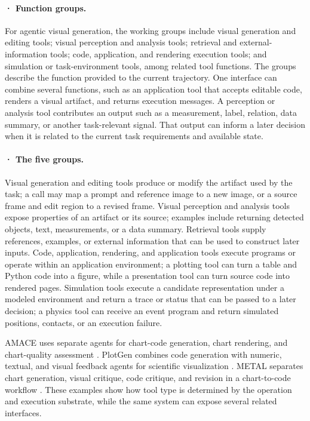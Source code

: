 \paragraph{· Function groups.} For agentic visual generation, the working groups include visual generation and editing tools; visual perception and analysis tools; retrieval and external-information tools; code, application, and rendering execution tools; and simulation or task-environment tools, among related tool functions. The groups describe the function provided to the current trajectory. One interface can combine several functions, such as an application tool that accepts editable code, renders a visual artifact, and returns execution messages. A perception or analysis tool contributes an output such as a measurement, label, relation, data summary, or another task-relevant signal. That output can inform a later decision when it is related to the current task requirements and available state.

\paragraph{· The five groups.} Visual generation and editing tools produce or modify the artifact used by the task; a call may map a prompt and reference image to a new image, or a source frame and edit region to a revised frame. Visual perception and analysis tools expose properties of an artifact or its source; examples include returning detected objects, text, measurements, or a data summary. Retrieval tools supply references, examples, or external information that can be used to construct later inputs. Code, application, rendering, and application tools execute programs or operate within an application environment; a plotting tool can turn a table and Python code into a figure, while a presentation tool can turn source code into rendered pages. Simulation tools execute a candidate representation under a modeled environment and return a trace or status that can be passed to a later decision; a physics tool can receive an event program and return simulated positions, contacts, or an execution failure.

AMACE uses separate agents for chart-code generation, chart rendering, and chart-quality assessment \cite{namgoong2025amace}. PlotGen combines code generation with numeric, textual, and visual feedback agents for scientific visualization \cite{goswami2025plotgen}. METAL separates chart generation, visual critique, code critique, and revision in a chart-to-code workflow \cite{li2025metal}. These examples show how tool type is determined by the operation and execution substrate, while the same system can expose several related interfaces.

